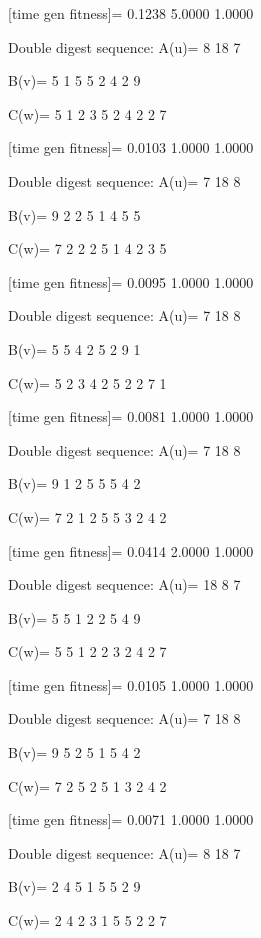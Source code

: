 [time gen fitness]=
    0.1238    5.0000    1.0000

Double digest sequence:
A(u)=
     8    18     7

B(v)=
     5     1     5     5     2     4     2     9

C(w)=
     5     1     2     3     5     2     4     2     2     7

[time gen fitness]=
    0.0103    1.0000    1.0000

Double digest sequence:
A(u)=
     7    18     8

B(v)=
     9     2     2     5     1     4     5     5

C(w)=
     7     2     2     2     5     1     4     2     3     5

[time gen fitness]=
    0.0095    1.0000    1.0000

Double digest sequence:
A(u)=
     7    18     8

B(v)=
     5     5     4     2     5     2     9     1

C(w)=
     5     2     3     4     2     5     2     2     7     1

[time gen fitness]=
    0.0081    1.0000    1.0000

Double digest sequence:
A(u)=
     7    18     8

B(v)=
     9     1     2     5     5     5     4     2

C(w)=
     7     2     1     2     5     5     3     2     4     2

[time gen fitness]=
    0.0414    2.0000    1.0000

Double digest sequence:
A(u)=
    18     8     7

B(v)=
     5     5     1     2     2     5     4     9

C(w)=
     5     5     1     2     2     3     2     4     2     7

[time gen fitness]=
    0.0105    1.0000    1.0000

Double digest sequence:
A(u)=
     7    18     8

B(v)=
     9     5     2     5     1     5     4     2

C(w)=
     7     2     5     2     5     1     3     2     4     2

[time gen fitness]=
    0.0071    1.0000    1.0000

Double digest sequence:
A(u)=
     8    18     7

B(v)=
     2     4     5     1     5     5     2     9

C(w)=
     2     4     2     3     1     5     5     2     2     7

